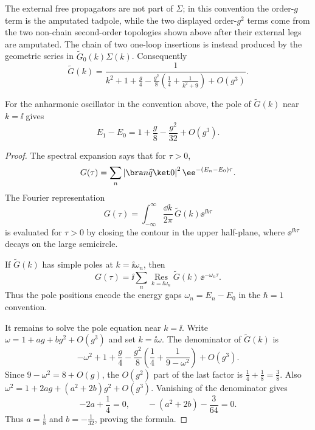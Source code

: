 The external free propagators are not part of \(\Sigma\); in this convention
the order-\(g\) term is the amputated tadpole, while the two displayed
order-\(g^2\) terms come from the two non-chain second-order topologies shown
above after their external legs are amputated.  The chain of two one-loop
insertions is instead produced by the geometric series in
\(\widetilde G_0(k)\Sigma(k)\).  Consequently
\[
  \widetilde G(k)
  =
  \frac{1}{
    k^2+1+\frac{g}{4}
    -\frac{g^2}{8}\left(\frac14+\frac{1}{k^2+9}\right)
    +O(g^3)
  }.
\]
\begin{proposition}
\label{prop:anharmonic-first-gap-from-two-point-pole}
For the anharmonic oscillator in the convention above, the pole of
\(\widetilde G(k)\) near \(k=\ii\) gives
\[
  E_1-E_0
  =
  1+\frac{g}{8}-\frac{g^2}{32}+O(g^3).
\]
\end{proposition}

\begin{proof}
The spectral expansion says that for \(\tau>0\),
\[
  G(\tau)
  =
  \sum_n
  \left|\bra n\widehat q\ket 0\right|^2
  \ee^{-(E_n-E_0)\tau}.
\]
The Fourier representation
\[
  G(\tau)
  =
  \int_{-\infty}^{\infty}\frac{\dd k}{2\pi}\,
  \widetilde G(k)\ee^{\ii k\tau}
\]
is evaluated for \(\tau>0\) by closing the contour in the upper half-plane,
where \(\ee^{\ii k\tau}\) decays on the large semicircle.
\begin{center}
\end{center}
If
\(\widetilde G(k)\) has simple poles at \(k=\ii\omega_n\), then
\[
  G(\tau)
  =
  \ii\sum_n
  \operatorname*{Res}_{k=\ii\omega_n}\widetilde G(k)\,
  \ee^{-\omega_n\tau}.
\]
Thus the pole positions encode the energy gaps \(\omega_n=E_n-E_0\) in the
\(\hbar=1\) convention.

It remains to solve the pole equation near \(k=\ii\).  Write
\(\omega=1+a g+b g^2+O(g^3)\) and set \(k=\ii\omega\).  The denominator of
\(\widetilde G(k)\) is
\[
  -\omega^2+1+\frac{g}{4}
  -\frac{g^2}{8}
  \left(
    \frac14+\frac{1}{9-\omega^2}
  \right)
  +O(g^3).
\]
Since \(9-\omega^2=8+O(g)\), the \(O(g^2)\) part of the last factor is
\(\frac14+\frac18=\frac38\).  Also
\(\omega^2=1+2ag+(a^2+2b)g^2+O(g^3)\).  Vanishing of the denominator gives
\[
  -2a+\frac14=0,
  \qquad
  -(a^2+2b)-\frac{3}{64}=0.
\]
Thus \(a=\frac18\) and \(b=-\frac1{32}\), proving the formula.
\end{proof}

